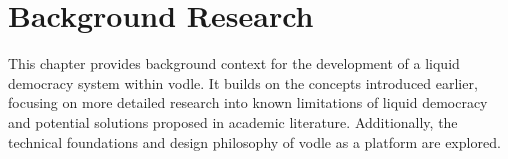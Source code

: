\chapter{Background Research}\label{ch:background}

This chapter provides background context for the development of a liquid democracy system within vodle. It builds on the concepts introduced earlier, focusing on more detailed research into known limitations of liquid democracy and potential solutions proposed in academic literature. Additionally, the technical foundations and design philosophy of vodle as a platform are explored.




